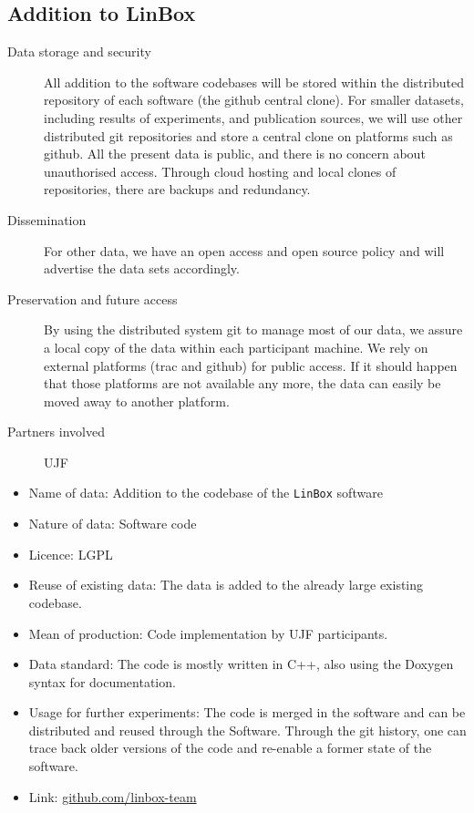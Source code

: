\documentclass[12pt]{article}
\begin{document}
\begin{enumerate}
\subsection{Addition to LinBox}

\begin{description}
\item[Data storage and security] All addition to the software codebases will be
  stored within the distributed repository of each software (the github central
  clone). For smaller datasets, including results of experiments, and publication
  sources, we will use other distributed git repositories and store a central clone on
  platforms such as github. All the present data is public, and there is no
  concern about unauthorised access. Through cloud hosting and local clones of
repositories, there are backups and redundancy.
\item[Dissemination] For other data, we have an open access and open source policy and will advertise the data sets accordingly.
\item[Preservation and future access] By using the distributed system git to manage most of our data, we assure a local copy of the data within each participant machine. We rely on external platforms (trac and github) for public access. If it should happen that those platforms are not available any more, the data can easily be moved away to another platform.
\item[Partners involved] UJF
\end{description}

\begin{itemize}
\item{Name of data:} Addition to the codebase of the \texttt{LinBox} software
\item{Nature of data:} Software code
\item{Licence:} LGPL
\item{Reuse of existing data:} The data is added to the already large existing codebase.
\item{Mean of production:} Code implementation by UJF participants.
\item{Data standard:} The code is mostly written in C++, also using the Doxygen syntax for documentation.
\item{Usage for further experiments:} The code is merged in the software and can be distributed and reused through the Software. Through the git history,
one can trace back older versions of the code and re-enable a former state of the software.
\item{Link:} \href{https://github.com/linbox-team}{github.com/linbox-team}
\end{itemize}


\end{enumerate}
\end{document}

